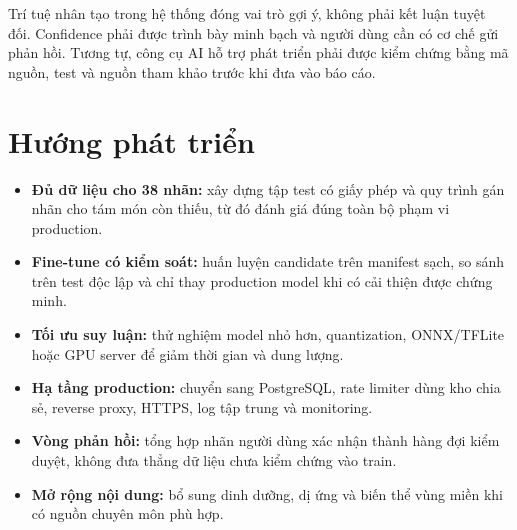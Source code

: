 Trí tuệ nhân tạo trong hệ thống đóng vai trò gợi ý, không phải kết luận tuyệt
đối. Confidence phải được trình bày minh bạch và người dùng cần có cơ chế gửi
phản hồi. Tương tự, công cụ AI hỗ trợ phát triển phải được kiểm chứng bằng mã
nguồn, test và nguồn tham khảo trước khi đưa vào báo cáo.

\section{Hướng phát triển}

\begin{itemize}
  \item \textbf{Đủ dữ liệu cho 38 nhãn:} xây dựng tập test có giấy phép và
        quy trình gán nhãn cho tám món còn thiếu, từ đó đánh giá đúng toàn bộ
        phạm vi production.
  \item \textbf{Fine-tune có kiểm soát:} huấn luyện candidate trên manifest
        sạch, so sánh trên test độc lập và chỉ thay production model khi có
        cải thiện được chứng minh.
  \item \textbf{Tối ưu suy luận:} thử nghiệm model nhỏ hơn, quantization,
        ONNX/TFLite hoặc GPU server để giảm thời gian và dung lượng.
  \item \textbf{Hạ tầng production:} chuyển sang PostgreSQL, rate limiter
        dùng kho chia sẻ, reverse proxy, HTTPS, log tập trung và monitoring.
  \item \textbf{Vòng phản hồi:} tổng hợp nhãn người dùng xác nhận thành hàng
        đợi kiểm duyệt, không đưa thẳng dữ liệu chưa kiểm chứng vào train.
  \item \textbf{Mở rộng nội dung:} bổ sung dinh dưỡng, dị ứng và biến thể
        vùng miền khi có nguồn chuyên môn phù hợp.
\end{itemize}
